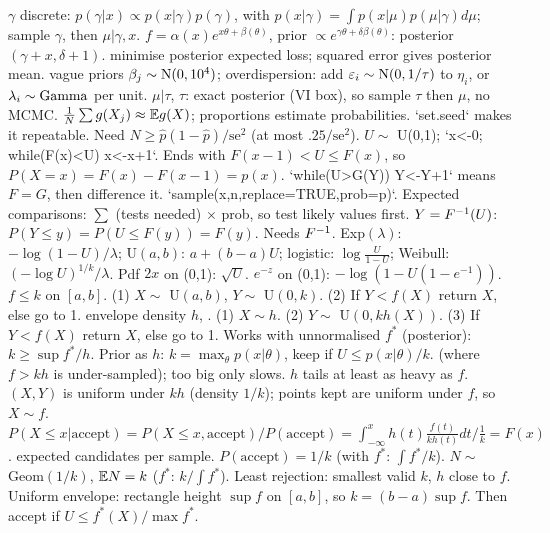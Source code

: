 \sk{} $\gamma$ discrete: $p(\gamma|x)\propto p(x|\gamma)p(\gamma)$, with $p(x|\gamma)=\int p(x|\mu)p(\mu|\gamma)d\mu$; sample $\gamma$, then $\mu|\gamma,x$.
\sk{} $f=\alpha(x)e^{x\theta+\beta(\theta)}$, prior $\propto e^{\gamma\theta+\delta\beta(\theta)}$: posterior $(\gamma+x,\delta+1)$.
\sk{} minimise posterior expected loss; squared error gives posterior mean.  vague priors $\beta_j\sim\mathrm{N}(0,10^4)$; overdispersion: add $\varepsilon_i\sim\mathrm{N}(0,1/\tau)$ to $\eta_i$, or $\lambda_i\sim\mathrm{Gamma}$ per unit.  $\mu|\tau$, $\tau$: exact posterior (VI box), so sample $\tau$ then $\mu$, no MCMC.
  $\frac1N\sum g(X_j)\approx\mathbb{E} g(X)$; proportions estimate probabilities. `set.seed` makes it repeatable. Need $N\ge\hat p(1-\hat p)/\mathrm{se}^2$ (at most $.25/\mathrm{se}^2$). 
\sk{} $U\sim$ U(0,1); `x<-0; while(F(x)<U) x<-x+1`. Ends with $F(x-1)<U\le F(x)$, so $P(X=x)=F(x)-F(x-1)=p(x)$.  `while(U>G(Y)) Y<-Y+1` means $F=G$, then difference it. `sample(x,n,replace=TRUE,prob=p)`. Expected comparisons: $\sum$ (tests needed) $\times$ prob, so test likely values first.
\sk{} $Y=F^{-1}(U)$: $P(Y\le y)=P(U\le F(y))=F(y)$. Needs $F^{-1}$. Exp$(\lambda)$: $-\log(1-U)/\lambda$; U$(a,b)$: $a+(b-a)U$; logistic: $\log\frac U{1-U}$; Weibull: $(-\log U)^{1/k}/\lambda$. Pdf $2x$ on (0,1): $\sqrt U$. $e^{-z}$ on (0,1): $-\log(1-U(1-e^{-1}))$.
\sk{} $f\le k$ on $[a,b]$. (1) $X\sim$ U$(a,b)$, $Y\sim$ U$(0,k)$. (2) If $Y<f(X)$ return $X$, else go to 1.
\sk{} envelope density $h$, . (1) $X\sim h$. (2) $Y\sim$ U$(0,kh(X))$. (3) If $Y<f(X)$ return $X$, else go to 1. Works with unnormalised $f^*$ (posterior): $k\ge\sup f^*/h$. Prior as $h$: $k=\max_\theta p(x|\theta)$, keep if $U\le p(x|\theta)/k$.  (where $f>kh$ is under-sampled); too big only slows. $h$ tails at least as heavy as $f$.
\sk{} $(X,Y)$ is uniform under $kh$ (density $1/k$); points kept are uniform under $f$, so $X\sim f$.
\sk{} $P(X\le x|\text{accept})=P(X\le x,\text{accept})/P(\text{accept})=\int_{-\infty}^xh(t)\frac{f(t)}{kh(t)}dt\big/\frac1k=F(x)$.
\sk{} expected candidates per sample. $P(\text{accept})=1/k$ (with $f^*$: $\int f^*/k$). $N\sim$ Geom$(1/k)$, $\mathbb{E} N=k$ ($f^*$: $k/\int f^*$). Least rejection: smallest valid $k$, $h$ close to $f$. Uniform envelope: rectangle height $\sup f$ on $[a,b]$, so $k=(b-a)\sup f$. Then accept if $U\le f^*(X)/\max f^*$.

